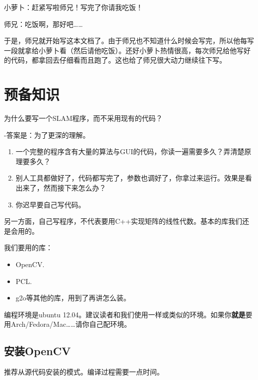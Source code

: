 \documentclass[9pt,a4paper]{article}
\begin{document}
小萝卜：赶紧写啦师兄！写完了你请我吃饭！

师兄：吃饭啊，那好吧……

于是，师兄就开始写这本文档了。由于师兄也不知道什么时候会写完，所以他每写一段就拿给小萝卜看（然后请他吃饭）。还好小萝卜热情很高，每次师兄给他写好的代码，都拿回去仔细看而且跑了。这也给了师兄很大动力继续往下写。

\section{预备知识}
为什么要写一个SLAM程序，而不采用现有的代码？

-答案是：为了更深的理解。

\begin{enumerate}
	\item 一个完整的程序含有大量的算法与GUI的代码，你读一遍需要多久？弄清楚原理要多久？
	\item 别人工具都做好了，代码都写完了，参数也调好了，你拿过来运行。效果是看出来了，然而接下来怎么办？
	\item 你迟早要自己写代码。
\end{enumerate}

另一方面，自己写程序，不代表要用C++实现矩阵的线性代数。基本的库我们还是会用的。

我们要用的库：
\begin{itemize}
	\item OpenCV.
	\item PCL.
	\item g2o等其他的库，用到了再讲怎么装。
\end{itemize}

编程环境是ubuntu 12.04。建议读者和我们使用一样或类似的环境。如果你\textbf{就是}要用Arch/Fedora/Mac……请你自己配环境。

\subsection{安装OpenCV}
推荐从源代码安装的模式。编译过程需要一点时间。
\end{document}
